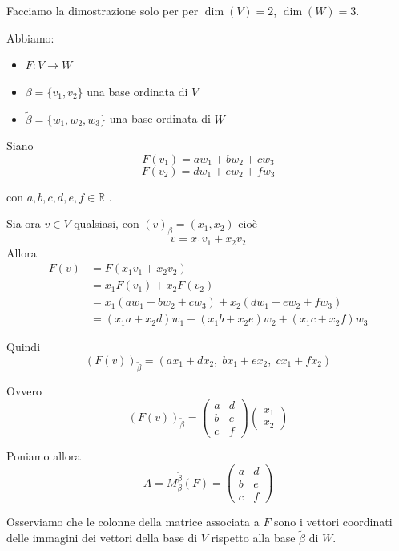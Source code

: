 \documentclass[
  a4paper,
]{article}
\providecommand{\tightlist}{%
  \setlength{\itemsep}{0pt}\setlength{\parskip}{0pt}}
\providecommand{\tightlist}{}
\begin{document}
\begin{proofbox}
Facciamo la dimostrazione solo per per \(\dim(V) = 2\),
\(\dim (W) = 3\).

Abbiamo:

\begin{itemize}
\tightlist
\item
  \(F : V \to W\)
\item
  \(\beta = \{v_1, v_2\}\) una base ordinata di \(V\)
\item
  \(\widetilde{\beta} = \{w_1, w_2, w_3\}\) una base ordinata di \(W\)
\end{itemize}

Siano \[
F(v_1) = a w_1 + b w_2 + c w_3
\] \[
F(v_2) = d w_1 + e w_2 + f w_3
\]

con \(a,b,c,d,e,f \in \mathbb{R}\) .

Sia ora \(v \in V\) qualsiasi, con \((v)_\beta = (x_1, x_2)\) cioè \[
v = x_1 v_1 + x_2 v_2
\] Allora \[
\begin{aligned}
F(v)
&= F(x_1 v_1 + x_2 v_2) \\
&= x_1 F(v_1) + x_2 F(v_2) \\
&= x_1(a w_1 + b w_2 + c w_3)
 + x_2(d w_1 + e w_2 + f w_3) \\
&= (x_1 a + x_2 d) w_1
 + (x_1 b + x_2 e) w_2
 + (x_1 c + x_2 f) w_3
\end{aligned}
\]

Quindi \[
(F(v))_{\widetilde{\beta}}
=
(a x_1 + d x_2,\;
 b x_1 + e x_2,\;
 c x_1 + f x_2)
\]

Ovvero \[
(F(v))_{\widetilde{\beta}}
=
\begin{pmatrix}
a & d \\
b & e \\
c & f
\end{pmatrix}
\begin{pmatrix}
x_1 \\
x_2
\end{pmatrix}
\]

Poniamo allora \[
A = M_{\beta}^{\widetilde{\beta}}(F)
=
\begin{pmatrix}
a & d \\
b & e \\
c & f
\end{pmatrix}
\]

Osserviamo che le colonne della matrice associata a \(F\) sono i vettori
coordinati delle immagini dei vettori della base di \(V\) rispetto alla
base \(\widetilde{\beta}\) di \(W\).
\end{proofbox}
\end{document}

